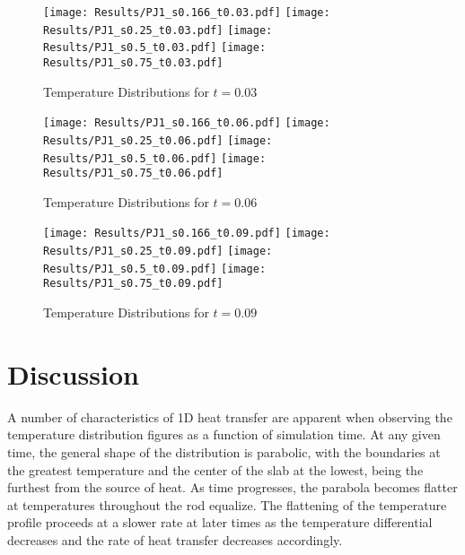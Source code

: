 \documentclass[twocolumn,10pt]{asme2ej}
\begin{document}
\begin{figure}[H]
\begin{center}
\texttt{[image: Results/PJ1\_s0.166\_t0.03.pdf]}
\texttt{[image: Results/PJ1\_s0.25\_t0.03.pdf]}
\texttt{[image: Results/PJ1\_s0.5\_t0.03.pdf]}
\texttt{[image: Results/PJ1\_s0.75\_t0.03.pdf]}
\caption{Temperature Distributions for $t = 0.03$}
\end{center}
\end{figure}

\clearpage
\begin{figure}[htb]
\begin{center}
\texttt{[image: Results/PJ1\_s0.166\_t0.06.pdf]}
\texttt{[image: Results/PJ1\_s0.25\_t0.06.pdf]}
\texttt{[image: Results/PJ1\_s0.5\_t0.06.pdf]}
\texttt{[image: Results/PJ1\_s0.75\_t0.06.pdf]}
\caption{Temperature Distributions for $t = 0.06$}
\end{center}
\end{figure}

\begin{figure}[htb]
\begin{center}
\texttt{[image: Results/PJ1\_s0.166\_t0.09.pdf]}
\texttt{[image: Results/PJ1\_s0.25\_t0.09.pdf]}
\texttt{[image: Results/PJ1\_s0.5\_t0.09.pdf]}
\texttt{[image: Results/PJ1\_s0.75\_t0.09.pdf]}
\caption{Temperature Distributions for $t = 0.09$}
\end{center}
\end{figure}

\clearpage
\section{Discussion}
A number of characteristics of 1D heat transfer are apparent when observing the temperature distribution figures as a function of simulation time.  At any given time, the general shape of the distribution is parabolic, with the boundaries at the greatest temperature and the center of the slab at the lowest, being the furthest from the source of heat.  As time progresses, the parabola becomes flatter at temperatures throughout the rod equalize.  The flattening of the temperature profile proceeds at a slower rate at later times as the temperature differential decreases and the rate of heat transfer decreases accordingly.
\end{document}
